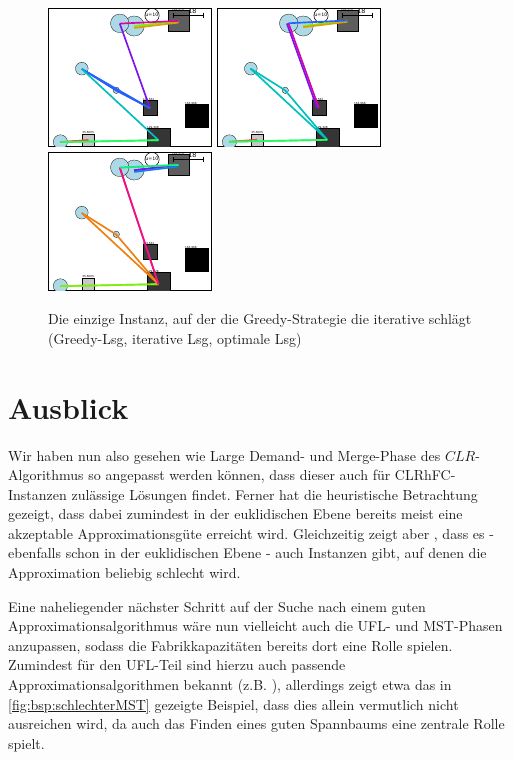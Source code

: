 \documentclass[a4paper,ngerman,11pt,bibtotoc]{scrartcl}
\theoremstyle{definition}
\theoremstyle{plain}
\theoremstyle{remark}
\newcommand{\CLR}{CLR}
\newcommand{\CLRHFC}{CLRhFC}
\newcommand{\MST}{MST}
\newcommand{\UFL}{UFL}
\begin{document}
	\begin{figure}[h]\centering
		\includegraphics[width=.3\textwidth]{bilder/GreedyBesser-Greedy.pdf}
		\includegraphics[width=.3\textwidth]{bilder/GreedyBesser-It.pdf}
		\includegraphics[width=.3\textwidth]{bilder/GreedyBesser-OPT.pdf}
		\caption{Die einzige Instanz, auf der die Greedy-Strategie die iterative schlägt \\ (Greedy-Lsg, iterative Lsg, optimale Lsg)}\label{fig:GreedyBesser}
	\end{figure}

\newpage

\section*{Ausblick}
	
Wir haben nun also gesehen wie Large Demand- und Merge-Phase des $\CLR$-Algorithmus so angepasst werden können, dass dieser auch für \CLRHFC-Instanzen zulässige Lösungen findet. Ferner hat die heuristische Betrachtung gezeigt, dass dabei zumindest in der euklidischen Ebene bereits meist eine akzeptable Approximationsgüte erreicht wird. Gleichzeitig zeigt aber , dass es - ebenfalls schon in der euklidischen Ebene - auch Instanzen gibt, auf denen die Approximation beliebig schlecht wird.
	
Eine naheliegender nächster Schritt auf der Suche nach einem guten Approximationsalgorithmus wäre nun vielleicht auch die \UFL- und \MST-Phasen anzupassen, sodass die Fabrikkapazitäten bereits dort eine Rolle spielen. Zumindest für den \UFL-Teil sind hierzu auch passende Approximationsalgorithmen bekannt (z.B. \cite{Pal01facilitylocation}), allerdings zeigt etwa das in \cref{fig:bsp:schlechterMST} gezeigte Beispiel, dass dies allein vermutlich nicht ausreichen wird, da auch das Finden eines guten Spannbaums eine zentrale Rolle spielt.
\end{document}

